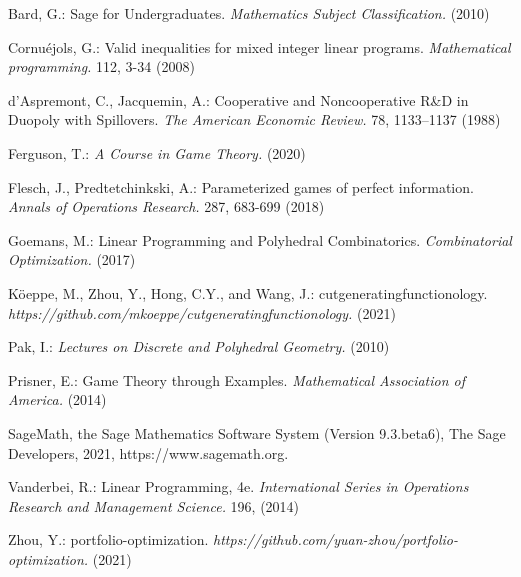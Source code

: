 \documentclass{article}
\begin{document}
\pagebreak
{}
\begin{thebibliography}{1}
\smallskip

\bibitem {}
Bard, G.:
Sage for Undergraduates.
{\it Mathematics Subject Classification.} (2010)

\bibitem {}
Cornu\'ejols, G.:
Valid inequalities for mixed integer linear programs.
{\it Mathematical programming.} 112, 3-34 (2008)

\bibitem {}
d'Aspremont, C., Jacquemin, A.:
Cooperative and Noncooperative R\&D in Duopoly with Spillovers.
{\it The American Economic Review.} 78, 1133--1137 (1988)

\bibitem {}
Ferguson, T.:
{\it A Course in Game Theory.} (2020)

\bibitem {}
Flesch, J., Predtetchinkski, A.:
Parameterized games of perfect information.
{\it Annals of Operations Research.} 287, 683-699 (2018)

\bibitem {}
Goemans, M.:
Linear Programming and Polyhedral Combinatorics.
{\it Combinatorial Optimization.} (2017)

\bibitem{}
K\"{o}eppe, M., Zhou, Y., Hong, C.Y., and Wang, J.:
cutgeneratingfunctionology.
{\it https://github.com/mkoeppe/cutgeneratingfunctionology.} (2021)

\bibitem {}
Pak, I.:
{\it Lectures on Discrete and Polyhedral Geometry.} (2010)

\bibitem {}
Prisner, E.:
Game Theory through Examples.
{\it Mathematical Association of America.} (2014)

\bibitem {}
SageMath, the Sage Mathematics Software System (Version 9.3.beta6), The Sage Developers, 2021, https://www.sagemath.org.

\bibitem {}
Vanderbei, R.:
Linear Programming, 4e.
{\it International Series in Operations Research and Management Science.} 196, (2014)

\bibitem {}
Zhou, Y.: portfolio-optimization. {\it https://github.com/yuan-zhou/portfolio-optimization.} (2021)

\end{thebibliography}
\end{document}
